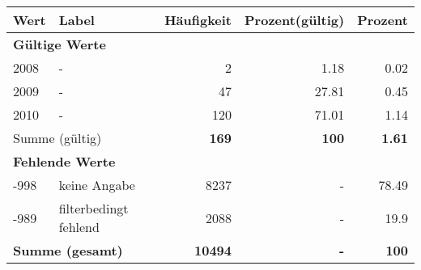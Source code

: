      \begin{longtable}{lXrrr}
     \toprule
     \textbf{Wert} & \textbf{Label} & \textbf{Häufigkeit} & \textbf{Prozent(gültig)} & \textbf{Prozent} \\
     \endhead
     \midrule
     \multicolumn{5}{l}{\textbf{Gültige Werte}}\\

     2008 &
     \multicolumn{1}{X}{ -  } &


       \num{2} &
       \num[round-mode=places,round-precision=2]{1.18} &
         \num[round-mode=places,round-precision=2]{0.02} \\

     2009 &
     \multicolumn{1}{X}{ -  } &


       \num{47} &
       \num[round-mode=places,round-precision=2]{27.81} &
         \num[round-mode=places,round-precision=2]{0.45} \\

     2010 &
     \multicolumn{1}{X}{ -  } &


       \num{120} &
       \num[round-mode=places,round-precision=2]{71.01} &
         \num[round-mode=places,round-precision=2]{1.14} \\
     \midrule
     \multicolumn{2}{l}{Summe (gültig)} &
       \textbf{\num{169}} &
     \textbf{\num{100}} &
       \textbf{\num[round-mode=places,round-precision=2]{1.61}} \\
     \multicolumn{5}{l}{\textbf{Fehlende Werte}}\\
       -998 &
       keine Angabe &
         \num{8237} &
        - &
         \num[round-mode=places,round-precision=2]{78.49} \\
       -989 &
       filterbedingt fehlend &
         \num{2088} &
        - &
         \num[round-mode=places,round-precision=2]{19.9} \\
     \midrule
     \multicolumn{2}{l}{\textbf{Summe (gesamt)}} &
          \textbf{\num{10494}} &
        \textbf{-} &
        \textbf{\num{100}} \\
     \bottomrule
     \end{longtable}
     
